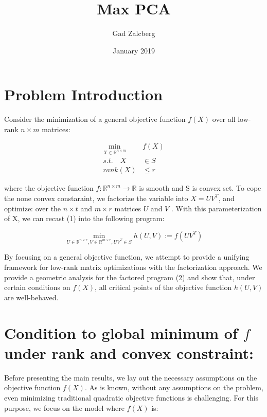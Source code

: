 \documentclass{article}
\title{Max PCA}
\author{Gad Zalcberg }
\date{January 2019}
\begin{document}
\maketitle

\section{Problem Introduction}
Consider the minimization of a general objective function
$f(X)$ over all low-rank $n\times m$ matrices:

\begin{equation}
\begin{split}
\min_{X\in \mathbb{R}^{n\times m}} & f\left(X\right)\\
s.t.\quad X & \in S\\
rank\left(X\right) &\le r
\end{split}
\end{equation}

where the objective function $f:\mathbb{R}^{n\times m} \rightarrow \mathbb{R}$ is smooth and S is convex set.
To cope the none convex constaraint, we factorize the variable into $X = U V^T$, and optimize: over the $n \times t$ and $m \times r$ matrices $U$ and $V$ . With this parameterization of X, we can recast (1) into the following program:

\begin{equation}
    \min_{U\in \mathbb{R}^{n\times r}, V\in \mathbb{R}^{m\times r},UV^T\in S} h\left(U,V\right):=f\left(UV^T\right)
\end{equation}

By focusing on a general objective function, we attempt to provide a unifying framework for low-rank matrix optimizations with the factorization approach. We provide a geometric analysis for the factored program (2) and show that, under certain conditions on $f(X)$, all critical points of the objective function $h\left(U,V\right)$ are well-behaved.


\section{Condition to global minimum of $f$ under rank and convex constraint:}

Before presenting the main results, we lay out the necessary assumptions on the objective function $f(X)$. As is known, without any assumptions on the problem, even minimizing traditional quadratic objective functions is challenging. For this purpose, we focus on the model where $f(X)$ is:
\end{document}
